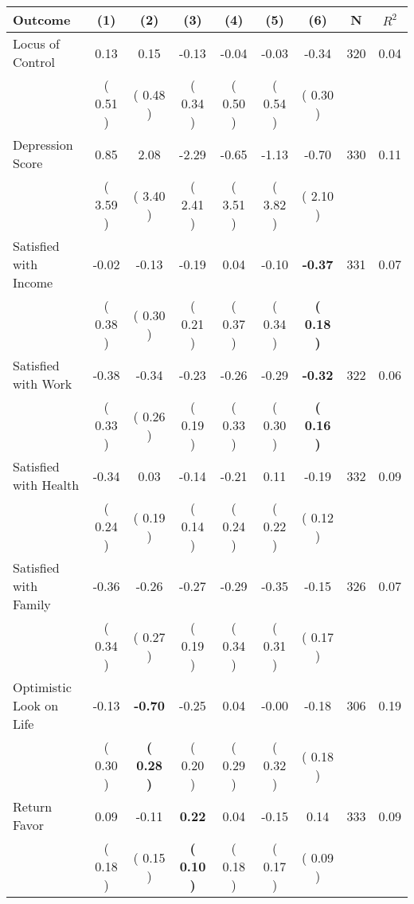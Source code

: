 \begin{tabular}{lcccccccc}
\toprule
 \textbf{Outcome} & \textbf{(1)} & \textbf{(2)} & \textbf{(3)} & \textbf{(4)} & \textbf{(5)} & \textbf{(6)} & \textbf{N} & \textbf{$ R^2$} \\
\midrule
Locus of Control &      0.13 &      0.15 &     -0.13 &     -0.04 &     -0.03 &     -0.34 & 320 &       0.04 \\ 
 & (     0.51 ) & (     0.48 ) & (     0.34 ) & (     0.50 ) & (     0.54 ) & (     0.30 ) & \\
Depression Score &      0.85 &      2.08 &     -2.29 &     -0.65 &     -1.13 &     -0.70 & 330 &       0.11 \\ 
 & (     3.59 ) & (     3.40 ) & (     2.41 ) & (     3.51 ) & (     3.82 ) & (     2.10 ) & \\
Satisfied with Income &     -0.02 &     -0.13 &     -0.19 &      0.04 &     -0.10 & \textbf{    -0.37} & 331 &       0.07 \\ 
 & (     0.38 ) & (     0.30 ) & (     0.21 ) & (     0.37 ) & (     0.34 ) & \textbf{(     0.18 )} & \\
Satisfied with Work &     -0.38 &     -0.34 &     -0.23 &     -0.26 &     -0.29 & \textbf{    -0.32} & 322 &       0.06 \\ 
 & (     0.33 ) & (     0.26 ) & (     0.19 ) & (     0.33 ) & (     0.30 ) & \textbf{(     0.16 )} & \\
Satisfied with Health &     -0.34 &      0.03 &     -0.14 &     -0.21 &      0.11 &     -0.19 & 332 &       0.09 \\ 
 & (     0.24 ) & (     0.19 ) & (     0.14 ) & (     0.24 ) & (     0.22 ) & (     0.12 ) & \\
Satisfied with Family &     -0.36 &     -0.26 &     -0.27 &     -0.29 &     -0.35 &     -0.15 & 326 &       0.07 \\ 
 & (     0.34 ) & (     0.27 ) & (     0.19 ) & (     0.34 ) & (     0.31 ) & (     0.17 ) & \\
Optimistic Look on Life &     -0.13 & \textbf{    -0.70} &     -0.25 &      0.04 &     -0.00 &     -0.18 & 306 &       0.19 \\ 
 & (     0.30 ) & \textbf{(     0.28 )} & (     0.20 ) & (     0.29 ) & (     0.32 ) & (     0.18 ) & \\
Return Favor &      0.09 &     -0.11 & \textbf{     0.22} &      0.04 &     -0.15 &      0.14 & 333 &       0.09 \\ 
 & (     0.18 ) & (     0.15 ) & \textbf{(     0.10 )} & (     0.18 ) & (     0.17 ) & (     0.09 ) & \\

\end{tabular}
